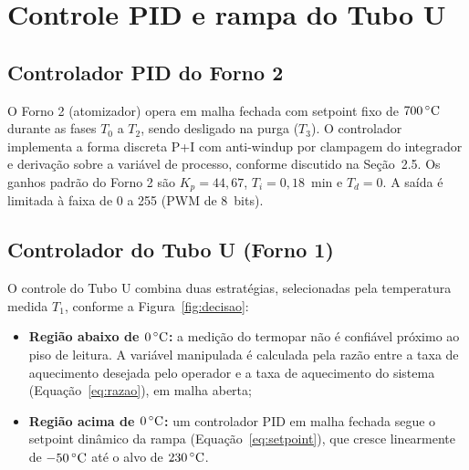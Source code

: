 \section{Controle PID e rampa do Tubo U}

\subsection{Controlador PID do Forno 2}

O Forno 2 (atomizador) opera em malha fechada com setpoint fixo de
$700\,\celsius$ durante as fases $T_0$ a $T_2$, sendo desligado na purga ($T_3$).
O controlador implementa a forma discreta P+I com anti-windup por clampagem do
integrador e deriva\c{c}\~ao sobre a vari\'avel de processo, conforme discutido
na Se\c{c}\~ao~2.5. Os ganhos padr\~ao do Forno 2 s\~ao
$K_p = 44{,}67$, $T_i = 0{,}18$~min e $T_d = 0$. A sa\'ida \'e limitada \`a
faixa de 0 a 255 (PWM de 8~bits).

\subsection{Controlador do Tubo U (Forno 1)}

O controle do Tubo U combina duas estrat\'egias, selecionadas pela temperatura
medida $T_1$, conforme a Figura~\ref{fig:decisao}:

\begin{itemize}
  \item \textbf{Regi\~ao abaixo de $0\,\celsius$:} a medi\c{c}\~ao do termopar
  n\~ao \'e confi\'avel pr\'oximo ao piso de leitura. A vari\'avel manipulada \'e
  calculada pela raz\~ao entre a taxa de aquecimento desejada pelo operador e a
  taxa de aquecimento do sistema (Equa\c{c}\~ao~\ref{eq:razao}), em malha aberta;
  \item \textbf{Regi\~ao acima de $0\,\celsius$:} um controlador PID em malha
  fechada segue o setpoint din\^amico da rampa (Equa\c{c}\~ao~\ref{eq:setpoint}),
  que cresce linearmente de $-50\,\celsius$ at\'e o alvo de $230\,\celsius$.
\end{itemize}

